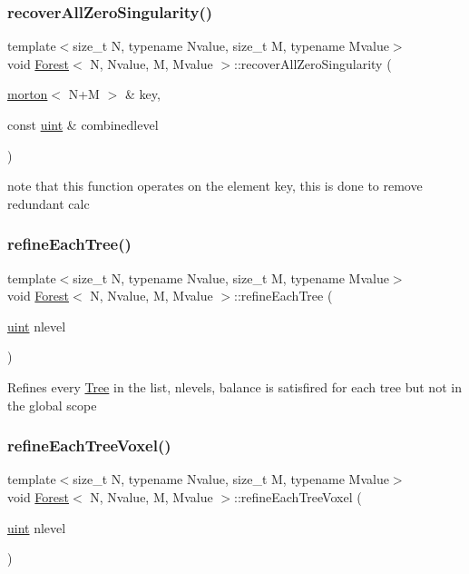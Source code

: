 \subsubsection{\texorpdfstring{recover\+All\+Zero\+Singularity()}{recoverAllZeroSingularity()}}
{\footnotesize\ttfamily template$<$size\+\_\+t N, typename Nvalue, size\+\_\+t M, typename Mvalue$>$ \\
void \mbox{\hyperlink{classForest}{Forest}}$<$ N, Nvalue, M, Mvalue $>$\+::recover\+All\+Zero\+Singularity (\begin{DoxyParamCaption}\item[{\mbox{\hyperlink{definitions_8h_af8682350bd8bb38ee9023f7a0a310add}{morton}}$<$ N+M $>$ \&}]{key,  }\item[{const \mbox{\hyperlink{definitions_8h_a69aa29b598b851b0640aa225a9e5d61d}{uint}} \&}]{combinedlevel }\end{DoxyParamCaption})}

note that this function operates on the element key, this is done to remove redundant calc \mbox{\label{classForest_a91235963450922043ca3bb067b2893d3}} 
\subsubsection{\texorpdfstring{refine\+Each\+Tree()}{refineEachTree()}}
{\footnotesize\ttfamily template$<$size\+\_\+t N, typename Nvalue, size\+\_\+t M, typename Mvalue$>$ \\
void \mbox{\hyperlink{classForest}{Forest}}$<$ N, Nvalue, M, Mvalue $>$\+::refine\+Each\+Tree (\begin{DoxyParamCaption}\item[{\mbox{\hyperlink{definitions_8h_a69aa29b598b851b0640aa225a9e5d61d}{uint}}}]{nlevel }\end{DoxyParamCaption})}

Refines every \mbox{\hyperlink{classTree}{Tree}} in the list, nlevels, balance is satisfired for each tree but not in the global scope \mbox{\label{classForest_a2c0af912578becb782670ff6cff36a7f}} 
\subsubsection{\texorpdfstring{refine\+Each\+Tree\+Voxel()}{refineEachTreeVoxel()}}
{\footnotesize\ttfamily template$<$size\+\_\+t N, typename Nvalue, size\+\_\+t M, typename Mvalue$>$ \\
void \mbox{\hyperlink{classForest}{Forest}}$<$ N, Nvalue, M, Mvalue $>$\+::refine\+Each\+Tree\+Voxel (\begin{DoxyParamCaption}\item[{\mbox{\hyperlink{definitions_8h_a69aa29b598b851b0640aa225a9e5d61d}{uint}}}]{nlevel }\end{DoxyParamCaption})}

